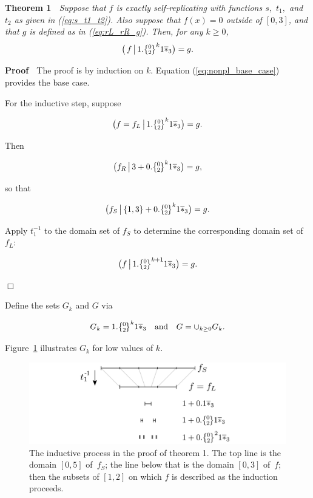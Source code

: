 \documentclass[20pt,]{extarticle}
\begin{document}
\textbf{Theorem 1} \(\;\) \emph{Suppose that \(f\) is exactly
self-replicating with functions \(s,\) \(t_1,\) and \(t_2\) as given in
(\ref{eq:s_t1_t2}). Also suppose that \(f(x) = 0\) outside of \([0,3]\),
and that \(g\) is defined as in (\ref{eq:rL_rR_g}). Then, for any
\(k\ge 0\), \[\big(\,f \restrict 1.\zerotwo^k1\lstar\big)=g.\]}

\textbf{Proof} \(\;\) The proof is by induction on \(k\). Equation
(\ref{eq:nonpl_base_case}) provides the base case.

For the inductive step, suppose

\[\big(f=f_L \restrict 1.\zerotwo^k1\lstar \big) = g.\]

Then

\[\big(f_R \restrict 3 + 0.\zerotwo^k1\lstar \big) = g,\]

so that

\[\big(f_S \restrict \{1,3\} + 0.\zerotwo^k1\lstar \big) = g.\]

Apply \(t_1^{-1}\) to the domain set of \(f_S\) to determine the
corresponding domain set of \(f_L\):

\[\big(f \restrict 1.\zerotwo^{k+1}1\lstar \big) = g.\]

\hfill\(\Box\)

Define the sets \(G_k\) and \(G\) via

\begin{equation}G_k = 1.\zerotwo^k1\lstar \quad\text{and}\quad
  G = \cup_{k \ge 0}G_k.\label{eq:Gk_G}\end{equation}

Figure~\ref{fig:nonpl_process} illustrates \(G_k\) for low values of
\(k\).

\begin{figure}
\centering
\includegraphics{images/nonpl_process.png}
\caption{The inductive process in the proof of theorem 1. The top line
is the domain \([0,5]\) of \(\,f_S\); the line below that is the domain
\([0,3]\) of \(\,f;\) then the subsets of \([1,2]\) on which \(f\) is
described as the induction proceeds.}\label{fig:nonpl_process}
\end{figure}
\end{document}
